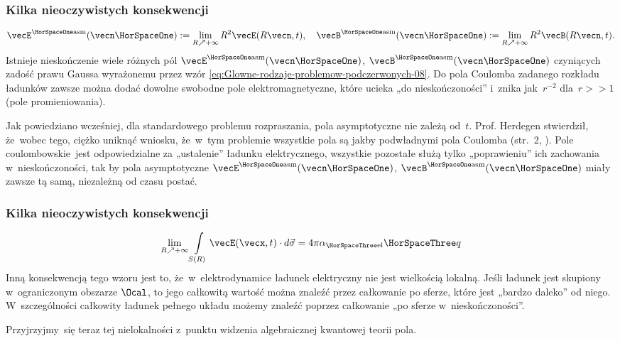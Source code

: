 \documentclass[10pt,t]{beamer}
\begin{document}
\begin{frame}
  \frametitle{Kilka nieoczywistych konsekwencji}

  \vspace{-1.5em}


  \begin{equation}
    \label{eq:Glowne-rodzaje-problemow-podczerwonych-10}
    \vecEasm :=
    \lim_{ R \nearrow +\infty } R^{ 2 } \vecE( R \vecn, t ), \quad
    \vecBasm :=
    \lim_{ R \nearrow +\infty } R^{ 2 } \vecB( R \vecn, t ).
  \end{equation}
  Istnieje nieskończenie wiele różnych pól $\vecEasm$, $\vecBasm$
  czyniących zadość prawu Gaussa wyrażonemu przez wzór
  \eqref{eq:Glowne-rodzaje-problemow-podczerwonych-08}. Do pola Coulomba
  zadanego rozkładu ładunków zawsze można dodać dowolne swobodne pole
  elektromagnetyczne, które ucieka „do nieskończoności” i~znika
  jak~$r^{ -2 }$ dla~$r >> 1$ (pole promieniowania).

  Jak powiedziano wcześniej, dla standardowego problemu rozpraszania,
  pola asymptotyczne nie zależą od~$t$. Prof. Herdegen stwierdził,
  że~wobec tego, ciężko uniknąć wniosku, że~w~tym problemie wszystkie pola
  są jakby podwładnymi pola Coulomba (str.~2,
  \parencite{Herdegen-Infrared-structure-beyond-locality-ETC-Ver-2024}).
  Pole coulombowskie~jest odpowiedzialne za „ustalenie” ładunku
  elektrycznego, wszystkie pozostałe służą tylko „poprawieniu” ich
  zachowania w~nieskończoności, tak by pola asymptotyczne $\vecEasm$,
  $\vecBasm$ miały zawsze tą samą, niezależną od czasu postać.

\end{frame}





\begin{frame}
  \frametitle{Kilka nieoczywistych konsekwencji}


  \begin{equation}
    \label{eq:Glowne-rodzaje-problemow-podczerwonych-11}
    \lim_{ R \nearrow +\infty } \int\limits_{ S( R ) } \vecE( \vecx, t ) \cdot d\vec{ \sigma } =
    4 \pi \alpha_{ \HorSpaceThree \text{el} } \HorSpaceThree q
  \end{equation}
  Inną konsekwencją tego wzoru jest to, że~w~elektrodynamice ładunek
  elektryczny nie jest wielkością lokalną. Jeśli ładunek jest skupiony
  w~ograniczonym obszarze $\Ocal$, to jego \alert{całkowitą} wartość można
  znaleźć przez całkowanie po sferze, które jest „bardzo daleko” od niego.
  W~szczególności całkowity ładunek pełnego układu możemy znaleźć poprzez
  całkowanie „po sferze w~nieskończoności”.

  Przyjrzyjmy~się teraz tej nielokalności z~punktu widzenia algebraicznej
  kwantowej teorii pola.

\end{frame}
\end{document}
